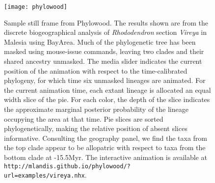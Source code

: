 \documentclass[11pt]{article}
\begin{document}
\newpage

\begin{figure}
\begin{center}
\texttt{[image: phylowood]}
\caption{
Sample still frame from Phylowood. The results shown are from the discrete biogeographical analysis of {\it Rhododendron} section {\it Vireya} in Malesia using BayArea. Much of the phylogenetic tree has been masked using mouse-issue commands, leaving two clades and their shared ancestry unmasked. The media slider indicates the current position of the animation with respect to the time-calibrated phylogeny, for which time six unmasked lineages are animated.  For the current animation time, each extant lineage is allocated an equal width slice of the pie. For each color, the depth of the slice indicates the approximate marginal posterior probability of the lineage occupying the area at that time. Pie slices are sorted phylogenetically, making the relative position of absent slices informative. Consulting the geography panel, we find the taxa from the top clade appear to be allopatric with respect to taxa from the bottom clade at -15.5Myr. The interactive animation is available at \texttt{http://mlandis.github.io/phylowood/?url=examples/vireya.nhx}.
}
\label{phylowood}
\end{center}
\end{figure}
\end{document}
